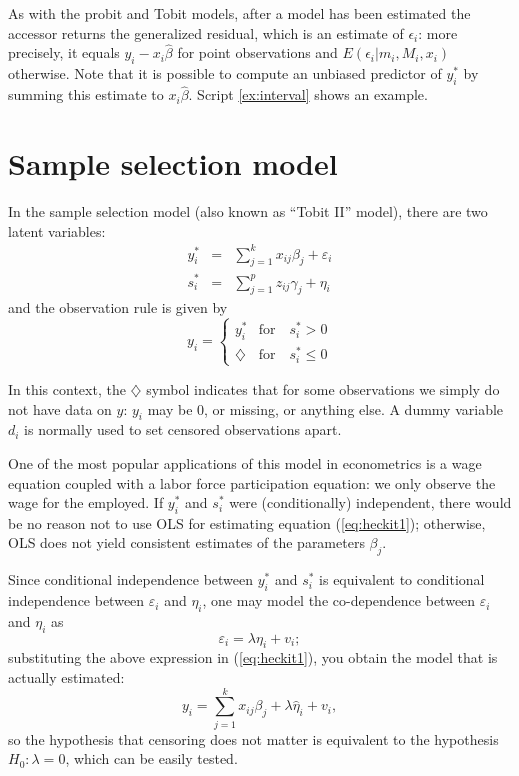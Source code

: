 As with the probit and Tobit models, after a model has been estimated
the  accessor returns the generalized residual, which is
an estimate of $\epsilon_i$: more precisely, it equals $y_i - x_i
\hat{\beta}$ for point observations and $E(\epsilon_i| m_i, M_i, x_i)$
otherwise. Note that it is possible to compute an unbiased predictor
of $y^*_i$ by summing this estimate to $x_i \hat{\beta}$. Script
\ref{ex:interval} shows an example. 


\section{Sample selection model}
\label{sec:heckit}

In the sample selection model (also known as ``Tobit II'' model),
there are two latent variables:
%
\begin{eqnarray}
  \label{eq:heckit1}
  y^*_i & = & \sum_{j=1}^k x_{ij} \beta_j + \varepsilon_i \\
  \label{eq:heckit2}
  s^*_i & = & \sum_{j=1}^p z_{ij} \gamma_j + \eta_i 
\end{eqnarray}
%
and the observation rule is given by
%
\begin{equation}
  \label{eq:tobitII}
  y_i = \left\{ 
    \begin{array}{ll} 
      y^*_i & \mathrm{for} \quad s^*_i > 0 \\ 
      \diamondsuit & \mathrm{for} \quad s^*_i \le 0 
    \end{array}
    \right. 
\end{equation}

In this context, the $\diamondsuit$ symbol indicates that for some
observations we simply do not have data on $y$: $y_i$ may be 0, or
missing, or anything else. A dummy variable $d_i$ is normally used to
set censored observations apart.

One of the most popular applications of this model in econometrics is
a wage equation coupled with a labor force participation equation: we
only observe the wage for the employed. If $y^*_i$ and $s^*_i$ were
(conditionally) independent, there would be no reason not to use OLS
for estimating equation (\ref{eq:heckit1}); otherwise, OLS does not
yield consistent estimates of the parameters $\beta_j$.

Since conditional independence between $y^*_i$ and $s^*_i$ is
equivalent to conditional independence between $\varepsilon_i$ and
$\eta_i$, one may model the co-dependence between $\varepsilon_i$ and
$\eta_i$ as 
\[
  \varepsilon_i = \lambda \eta_i + v_i ;
\]
substituting the above expression in (\ref{eq:heckit1}), you obtain
the model that is actually estimated:
\[
  y_i = \sum_{j=1}^k x_{ij} \beta_j + \lambda \hat{\eta}_i + v_i ,
\]
so the hypothesis that censoring does not matter is equivalent to the
hypothesis $H_0: \lambda = 0$, which can be easily tested.

